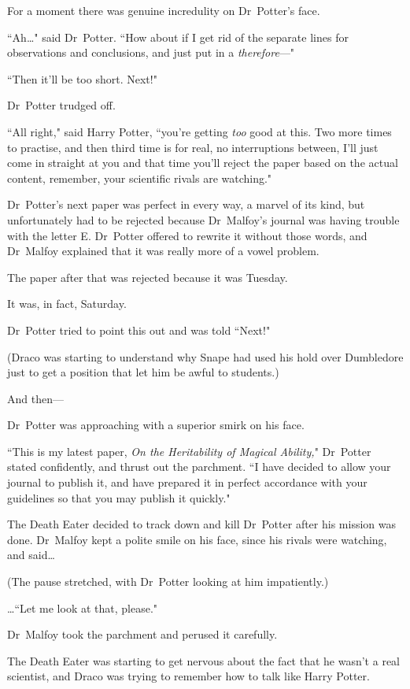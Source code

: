 For a moment there was genuine incredulity on Dr~Potter's face.

``Ah{\ldots}" said Dr~Potter. ``How about if I get rid of the separate lines for observations and conclusions, and just put in a \emph{therefore}—"

``Then it'll be too short. Next!"

Dr~Potter trudged off.

``All right," said Harry Potter, ``you're getting \emph{too} good at this. Two more times to practise, and then third time is for real, no interruptions between, I'll just come in straight at you and that time you'll reject the paper based on the actual content, remember, your scientific rivals are watching."

Dr~Potter's next paper was perfect in every way, a marvel of its kind, but unfortunately had to be rejected because Dr~Malfoy's journal was having trouble with the letter E\@. Dr~Potter offered to rewrite it without those words, and Dr~Malfoy explained that it was really more of a vowel problem.

The paper after that was rejected because it was Tuesday.

It was, in fact, Saturday.

Dr~Potter tried to point this out and was told ``Next!"

(Draco was starting to understand why Snape had used his hold over Dumbledore just to get a position that let him be awful to students.)

And then—

Dr~Potter was approaching with a superior smirk on his face.

``This is my latest paper, \emph{On the Heritability of Magical Ability,}" Dr~Potter stated confidently, and thrust out the parchment. ``I have decided to allow your journal to publish it, and have prepared it in perfect accordance with your guidelines so that you may publish it quickly."

The Death Eater decided to track down and kill Dr~Potter after his mission was done. Dr~Malfoy kept a polite smile on his face, since his rivals were watching, and said{\ldots}

(The pause stretched, with Dr~Potter looking at him impatiently.)

{\ldots}``Let me look at that, please."

Dr~Malfoy took the parchment and perused it carefully.

The Death Eater was starting to get nervous about the fact that he wasn't a real scientist, and Draco was trying to remember how to talk like Harry Potter.

